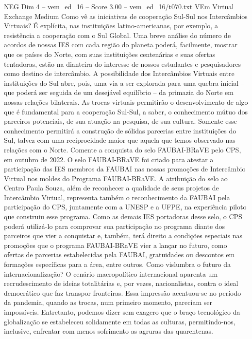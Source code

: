 \begin{textsample}{NEG Dim 4 – vem\_ed\_16 – Score 3.00 – vem\_ed\_16/t070.txt}  \label{ex:f4_neg_096}
VEm Virtual Exchange Medium Como vê as iniciativas de cooperação Sul-Sul nos Intercâmbios Virtuais?
É explícita, nas instituições latino-americanas, por exemplo, a resistência a cooperação com o Sul Global.
Uma breve análise do número de acordos de nossas IES com cada região do planeta poderá, facilmente, mostrar que os países do Norte, com suas instituições centenárias e suas ofertas tentadoras, estão na dianteira do interesse de nossos estudantes e pesquisadores como destino de intercâmbio.
A possibilidade dos Intercâmbios Virtuais entre instituições do Sul abre, pois, uma via a ser explorada para uma quebra inicial – que poderá ser seguida de um desejável equilíbrio – da primazia do Norte em nossas relações bilaterais.
As trocas virtuais permitirão o desenvolvimento de algo que é fundamental para a cooperação Sul-Sul, a saber, o conhecimento mútuo dos parceiros potenciais, de sua atuação na pesquisa, de sua cultura.
Somente esse conhecimento permitirá a construção de sólidas parcerias entre instituições do Sul, talvez com uma reciprocidade maior que aquela que temos observado nas relações com o Norte.
Comente a conquista do selo FAUBAI-BRaVE pelo CPS, em outubro de 2022.
O selo FAUBAI-BRaVE foi criado para atestar a participação das IES membros da FAUBAI nas nossas promoções de Intercâmbio Virtual nos moldes do Programa FAUBAI-BRaVE.
A atribuição do selo ao Centro Paula Souza, além de reconhecer a qualidade de seus projetos de Intercâmbio Virtual, representa também o reconhecimento da FAUBAI pela participação do CPS, juntamente com a UNESP e a UFPE, na experiência piloto que construiu esse programa.
Como as demais IES portadoras desse selo, o CPS poderá utilizá-lo para comprovar sua participação no programa diante dos parceiros que vier a conquistar e, também, terá direito a condições especiais nas promoções que o programa FAUBAI-BRaVE vier a lançar no futuro, como ofertas de parcerias estabelecidas pela FAUBAI, gratuidades ou descontos em formações específicas para a área, entre outros.
Como vislumbra o futuro da internacionalização?
O cenário macropolítico internacional aparenta um recrudescimento de ideias totalitárias e, por vezes, nacionalistas, contra o ideal democrático que faz transpor fronteiras.
Essa impressão acentuou-se no período da pandemia, quando as trocas, num primeiro momento, pareciam ser impossíveis.
Entretanto, podemos dizer sem exagero que o braço tecnológico da globalização se estabeleceu solidamente em todas as culturas, permitindo-nos, inclusive, enfrentar com menos sofrimento as agruras das quarentenas.

\end{textsample}
